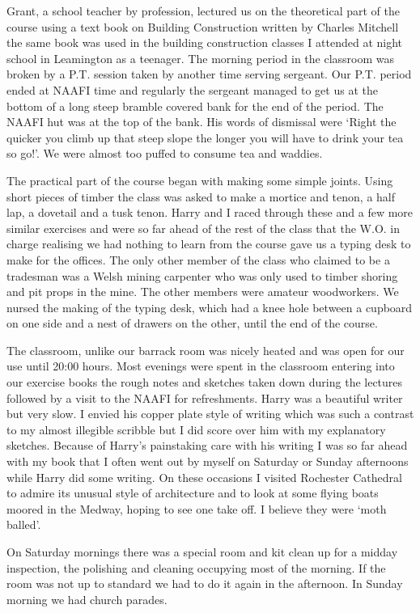 \SSergeant Grant, a school teacher by profession, lectured us on
the theoretical part of the course using a text book on Building
Construction written by Charles Mitchell the same book was used in the
building construction classes I attended at night school in Leamington
as a teenager. The morning period in the classroom was broken by a
P.T. session taken by another time serving sergeant. Our P.T. period
ended at NAAFI time and regularly the sergeant managed to get us at the
bottom of a long steep bramble covered bank for the end of the
period. The NAAFI hut was at the top of the bank. His words of
dismissal were `Right the quicker you climb up that steep slope the
longer you will have to drink your tea so go!'. We were almost too
puffed to consume tea and waddies.

The practical part of the course began with making some simple
joints. Using short pieces of timber the class was asked to make a
mortice and tenon, a half lap, a dovetail and a tusk tenon. Harry and
I raced through these and a few more similar exercises and were so far
ahead of the rest of the class that the W.O. in charge realising we
had nothing to learn from the course gave us a typing desk to make for
the offices. The only other member of the class who claimed to be a
tradesman was a Welsh mining carpenter who was only used to timber
shoring and pit props in the mine. The other members were amateur
woodworkers. We nursed the making of the typing desk, which had a knee
hole between a cupboard on one side and a nest of drawers on the
other, until the end of the course.

The classroom, unlike our barrack room was nicely heated and was open
for our use until 20:00 hours. Most evenings were spent in the classroom
entering into our exercise books the rough notes and sketches taken
down during the lectures followed by a visit to the NAAFI for
refreshments. Harry was a beautiful writer but very slow. I envied his
copper plate style of writing which was such a contrast to my almost
illegible scribble but I did score over him with my explanatory
sketches. Because of Harry's painstaking care with his writing I was
so far ahead with my book that I often went out by myself on Saturday
or Sunday afternoons while Harry did some writing. On these occasions
I visited Rochester Cathedral to admire its unusual style of
architecture and to look at some flying boats moored in the Medway,
hoping to see one take off. I believe they were `moth balled'.

On Saturday mornings there was a special room and kit clean up for a
midday inspection, the polishing and cleaning occupying most of the
morning. If the room was not up to standard we had to do it again in
the afternoon. In Sunday morning we had church parades.

